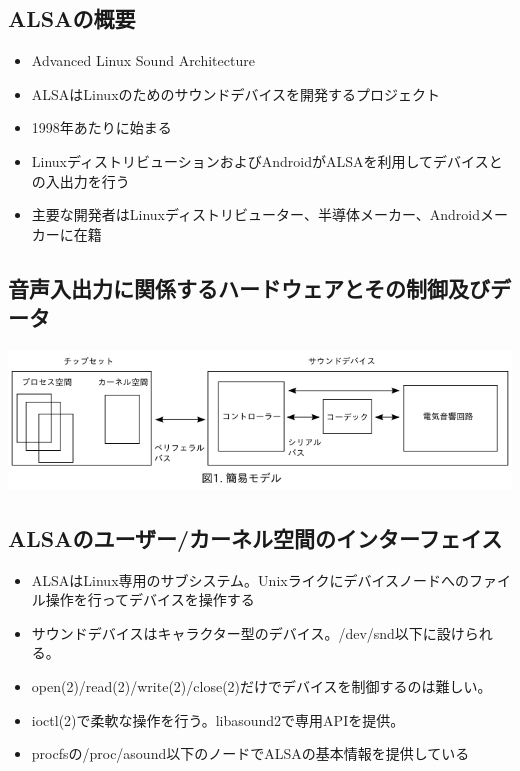 \documentclass[mingoth,a4paper]{jsarticle}
\begin{document}

\subsection{ALSAの概要}
\begin{itemize}
\item Advanced Linux Sound Architecture
\item ALSAはLinuxのためのサウンドデバイスを開発するプロジェクト
\item 1998年あたりに始まる
\item LinuxディストリビューションおよびAndroidがALSAを利用してデバイスとの入出力を行う
\item 主要な開発者はLinuxディストリビューター、半導体メーカー、Androidメーカーに在籍
\end{itemize}

\subsection{音声入出力に関係するハードウェアとその制御及びデータ}
\includegraphics[width=14.0cm]{image201309/alsa.png}

\subsection{ALSAのユーザー/カーネル空間のインターフェイス}
\begin{itemize}
\item ALSAはLinux専用のサブシステム。Unixライクにデバイスノードへのファイル操作を行ってデバイスを操作する
\item サウンドデバイスはキャラクター型のデバイス。/dev/snd以下に設けられる。
\item open(2)/read(2)/write(2)/close(2)だけでデバイスを制御するのは難しい。
\item ioctl(2)で柔軟な操作を行う。libasound2で専用APIを提供。
\item procfsの/proc/asound以下のノードでALSAの基本情報を提供している
\end{itemize}
\end{document}
